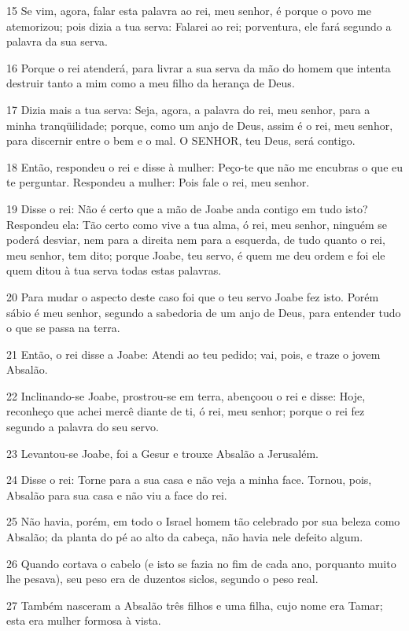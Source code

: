 \par 15 Se vim, agora, falar esta palavra ao rei, meu senhor, é porque o povo me atemorizou; pois dizia a tua serva: Falarei ao rei; porventura, ele fará segundo a palavra da sua serva.
\par 16 Porque o rei atenderá, para livrar a sua serva da mão do homem que intenta destruir tanto a mim como a meu filho da herança de Deus.
\par 17 Dizia mais a tua serva: Seja, agora, a palavra do rei, meu senhor, para a minha tranqüilidade; porque, como um anjo de Deus, assim é o rei, meu senhor, para discernir entre o bem e o mal. O SENHOR, teu Deus, será contigo.
\par 18 Então, respondeu o rei e disse à mulher: Peço-te que não me encubras o que eu te perguntar. Respondeu a mulher: Pois fale o rei, meu senhor.
\par 19 Disse o rei: Não é certo que a mão de Joabe anda contigo em tudo isto? Respondeu ela: Tão certo como vive a tua alma, ó rei, meu senhor, ninguém se poderá desviar, nem para a direita nem para a esquerda, de tudo quanto o rei, meu senhor, tem dito; porque Joabe, teu servo, é quem me deu ordem e foi ele quem ditou à tua serva todas estas palavras.
\par 20 Para mudar o aspecto deste caso foi que o teu servo Joabe fez isto. Porém sábio é meu senhor, segundo a sabedoria de um anjo de Deus, para entender tudo o que se passa na terra.
\par 21 Então, o rei disse a Joabe: Atendi ao teu pedido; vai, pois, e traze o jovem Absalão.
\par 22 Inclinando-se Joabe, prostrou-se em terra, abençoou o rei e disse: Hoje, reconheço que achei mercê diante de ti, ó rei, meu senhor; porque o rei fez segundo a palavra do seu servo.
\par 23 Levantou-se Joabe, foi a Gesur e trouxe Absalão a Jerusalém.
\par 24 Disse o rei: Torne para a sua casa e não veja a minha face. Tornou, pois, Absalão para sua casa e não viu a face do rei.
\par 25 Não havia, porém, em todo o Israel homem tão celebrado por sua beleza como Absalão; da planta do pé ao alto da cabeça, não havia nele defeito algum.
\par 26 Quando cortava o cabelo (e isto se fazia no fim de cada ano, porquanto muito lhe pesava), seu peso era de duzentos siclos, segundo o peso real.
\par 27 Também nasceram a Absalão três filhos e uma filha, cujo nome era Tamar; esta era mulher formosa à vista.
